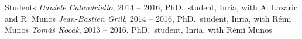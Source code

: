 \documentclass{resume}
\begin{document}







\begin{category}{Students}
\citembullet \textit{Daniele Calandriello}, 2014 -- 2016, PhD.\, student,
Inria, with A. Lazaric and R. Munos
\citembullet \textit{Jean-Bastien Grill}, 2014 -- 2016, PhD.\, student,
Inria, with R\' emi Munos
 \citembullet \textit{Tom\'a\v s Koc\' ak}, 2013 -- 2016, PhD.\, student,
Inria, with R\' emi Munos
\end{category}
\end{document}

